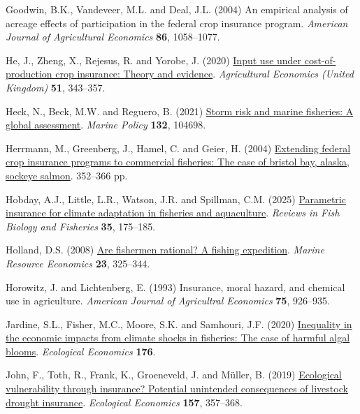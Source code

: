 \documentclass[
  letterpaper,
  DIV=11,
  numbers=noendperiod]{scrartcl}
\newlength{\cslhangindent}
\newenvironment{CSLReferences}[2] %
 {\begin{list}{}{%
  \setlength{\itemindent}{0pt}
  \setlength{\leftmargin}{0pt}
  \setlength{\parsep}{0pt}
  \ifodd #1
   \setlength{\leftmargin}{\cslhangindent}
   \setlength{\itemindent}{-1\cslhangindent}
  \fi
  \setlength{\itemsep}{#2\baselineskip}}}
 {\end{list}}
\theoremstyle{plain}
\theoremstyle{plain}
\theoremstyle{remark}
\begin{document}
\begin{CSLReferences}{1}{0}
Goodwin, B.K., Vandeveer, M.L. and Deal, J.L. (2004) An empirical
analysis of acreage effects of participation in the federal crop
insurance program. \emph{American Journal of Agricultural Economics}
\textbf{86}, 1058--1077.

He, J., Zheng, X., Rejesus, R. and Yorobe, J. (2020)
\href{https://doi.org/10.1111/AGEC.12558}{Input use under
cost-of-production crop insurance: Theory and evidence}.
\emph{Agricultural Economics (United Kingdom)} \textbf{51}, 343--357.

Heck, N., Beck, M.W. and Reguero, B. (2021)
\href{https://doi.org/10.1016/j.marpol.2021.104698}{Storm risk and
marine fisheries: A global assessment}. \emph{Marine Policy}
\textbf{132}, 104698.

Herrmann, M., Greenberg, J., Hamel, C. and Geier, H. (2004)
\href{https://doi.org/10.1577/M02-086.1}{Extending federal crop
insurance programs to commercial fisheries: The case of bristol bay,
alaska, sockeye salmon}. 352--366 pp.

Hobday, A.J., Little, L.R., Watson, J.R. and Spillman, C.M. (2025)
\href{https://doi.org/10.1007/s11160-025-09920-3}{Parametric insurance
for climate adaptation in fisheries and aquaculture}. \emph{Reviews in
Fish Biology and Fisheries} \textbf{35}, 175--185.

Holland, D.S. (2008)
\href{https://doi.org/10.1086/mre.23.3.42629621}{Are fishermen rational?
A fishing expedition}. \emph{Marine Resource Economics} \textbf{23},
325--344.

Horowitz, J. and Lichtenberg, E. (1993) Insurance, moral hazard, and
chemical use in agriculture. \emph{American Journal of Agricultral
Economics} \textbf{75}, 926--935.

Jardine, S.L., Fisher, M.C., Moore, S.K. and Samhouri, J.F. (2020)
\href{https://doi.org/10.1016/j.ecolecon.2020.106691}{Inequality in the
economic impacts from climate shocks in fisheries: The case of harmful
algal blooms}. \emph{Ecological Economics} \textbf{176}.

John, F., Toth, R., Frank, K., Groeneveld, J. and Müller, B. (2019)
\href{https://doi.org/10.1016/J.ECOLECON.2018.11.021}{Ecological
vulnerability through insurance? Potential unintended consequences of
livestock drought insurance}. \emph{Ecological Economics} \textbf{157},
357--368.


\end{CSLReferences}
\end{document}
